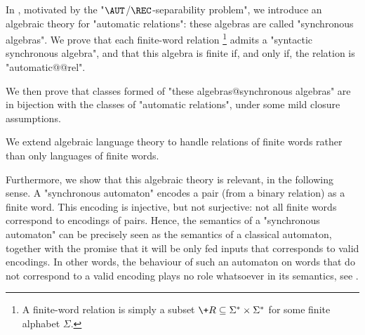 In , motivated by the "$\AUT$/$\REC$-separability problem",
we introduce an algebraic theory for "automatic relations": these algebras are called
"synchronous algebras".
We prove that each finite-word relation%
\footnote{A finite-word relation is simply a subset
$\+R \subseteq \Sigma^* \times \Sigma^*$ for some finite alphabet $\Sigma$.}
admits a "syntactic synchronous algebra",
and that this algebra is finite if, and only if, the relation is "automatic@@rel".

We then prove that classes formed of "these algebras@synchronous algebras" 
are in bijection with the classes of "automatic relations", under some mild closure
assumptions. 

\begin{contribution}
	We extend algebraic language theory to handle relations of finite words
	rather than only languages of finite words.
\end{contribution}

Furthermore, we show that this algebraic theory is relevant, in the following sense.
A "synchronous automaton" encodes a pair (from a binary relation) as
a finite word. This encoding is injective, but not
surjective: not all finite words correspond to encodings of pairs.
Hence, the semantics of a "synchronous automaton" can be precisely seen
as the semantics of a classical automaton, together with the promise that it will be only
fed inputs that corresponds to valid encodings. In other words,
the behaviour of such an automaton on words that do not correspond to a valid encoding
plays no role whatsoever in its semantics, see .

